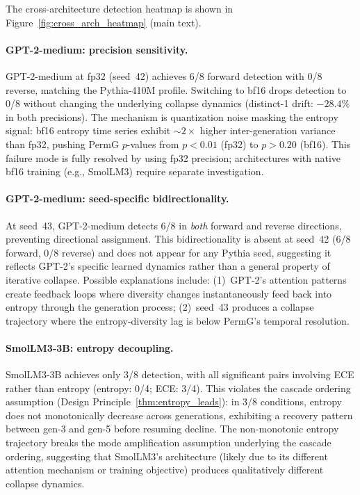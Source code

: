 The cross-architecture detection heatmap is shown in Figure~\ref{fig:cross_arch_heatmap} (main text).

\paragraph{GPT-2-medium: precision sensitivity.}
GPT-2-medium at fp32 (seed~42) achieves 6/8 forward detection with 0/8 reverse, matching the Pythia-410M profile.
Switching to bf16 drops detection to 0/8 without changing the underlying collapse dynamics (distinct-1 drift: $-28.4\%$ in both precisions).
The mechanism is quantization noise masking the entropy signal: bf16 entropy time series exhibit ${\sim}2{\times}$ higher inter-generation variance than fp32, pushing PermG $p$-values from $p{<}0.01$ (fp32) to $p{>}0.20$ (bf16).
This failure mode is fully resolved by using fp32 precision; architectures with native bf16 training (e.g., SmolLM3) require separate investigation.

\paragraph{GPT-2-medium: seed-specific bidirectionality.}
At seed~43, GPT-2-medium detects 6/8 in \emph{both} forward and reverse directions, preventing directional assignment.
This bidirectionality is absent at seed~42 (6/8 forward, 0/8 reverse) and does not appear for any Pythia seed, suggesting it reflects GPT-2's specific learned dynamics rather than a general property of iterative collapse.
Possible explanations include: (1)~GPT-2's attention patterns create feedback loops where diversity changes instantaneously feed back into entropy through the generation process; (2)~seed~43 produces a collapse trajectory where the entropy-diversity lag is below PermG's temporal resolution.

\paragraph{SmolLM3-3B: entropy decoupling.}
SmolLM3-3B achieves only 3/8 detection, with all significant pairs involving ECE rather than entropy (entropy: 0/4; ECE: 3/4).
This violates the cascade ordering assumption (Design Principle~\ref{thm:entropy_leads}): in 3/8 conditions, entropy does not monotonically decrease across generations, exhibiting a recovery pattern between gen-3 and gen-5 before resuming decline.
The non-monotonic entropy trajectory breaks the mode amplification assumption underlying the cascade ordering, suggesting that SmolLM3's architecture (likely due to its different attention mechanism or training objective) produces qualitatively different collapse dynamics.

